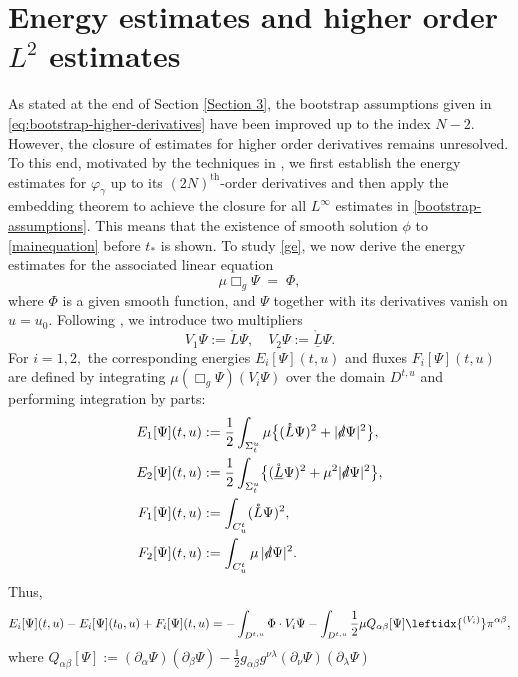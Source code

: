 \documentclass[11pt,twoside]{article}
\def\al{\alpha}
\def\vp{\varphi}
\def\f{\frac}
\def\p{\partial}
\begin{document}
\section{Energy estimates and higher order $L^2$ estimates}\label{EE}
As stated at the end of Section \ref{Section 3}, the bootstrap assumptions given in \eqref{eq:bootstrap-higher-derivatives} have been improved up to the index $N-2$. However, the closure of estimates for higher order derivatives remains unresolved. To this end, motivated by the techniques in \cite{Ding2,Ding3,Ding4,L-Y,M-Y,Sp}, we first establish the energy estimates for $\vp_\gamma$ up to its $(2N)^{\text{th}}$-order derivatives and then apply the embedding theorem to achieve the closure for all $L^\infty$ estimates in \eqref{bootstrap-assumptions}.
This means that the existence of smooth solution $\phi$ to \eqref{mainequation} before $t_*$ is shown.
To study \eqref{ge}, we now derive the energy estimates for the associated linear equation
\begin{equation}\label{gel}
\mu\Box_g\Psi \;=\; \Phi,
\end{equation}
where $\Phi$ is a given smooth function, and $\Psi$ together with its derivatives vanish on $u =u_0$.
Following \cite{L-Y,M-Y}, we introduce two multipliers
\[
V_1\Psi := \mathring{L}\Psi,\quad V_2\Psi := \mathring{\underline{L}}\Psi.
\]
For $i=1,2,$ the corresponding energies $E_i[\Psi](t, u)$ and fluxes $F_i[\Psi](t, u)$ are defined by integrating $\mu(\Box_g\Psi)(V_i\Psi)$ over the domain $D^{t,u}$ and performing integration by parts:
\begin{align}
E_1[\Psi](t, u) &:= \frac{1}{2} \int_{\Sigma_t^{u}} \mu \bigl\{ (\mathring{L}\Psi)^2 + |\slashed{d}\Psi|^2 \bigr\}, \label{E1} \\
E_2[\Psi](t, u) &:= \frac{1}{2} \int_{\Sigma_t^{u}} \bigl\{ (\mathring{\underline{L}}\Psi)^2 + \mu^2 |\slashed{d}\Psi|^2\bigr\}, \label{E2} \\
F_1[\Psi](t, u) &:= \int_{C_{u}^t} (\mathring{L}\Psi)^2, \label{F1} \\
F_2[\Psi](t, u) &:= \int_{C_{u}^t} \mu \, |\slashed{d}\Psi|^2. \label{F2}
\end{align}
Thus,
\begin{equation}\label{EI}
E_i[\Psi](t, u)-E_i[\Psi](t_0, u)+F_i[\Psi](t, u)=-\int_{D^{t, u}}\Phi\cdot V_i\Psi-\int_{D^{t, u}}\f12\mu Q_{\al\beta}[\Psi]\leftidx{^{(V_i)}}\pi^{\al\beta},
\end{equation}
where
$Q_{\al\beta}[\Psi]:=(\p_\al\Psi)(\p_\beta\Psi)-\f12 g_{\al\beta}g^{\nu\lambda}(\p_\nu\Psi)(\p_\lambda\Psi)$
\end{document}
